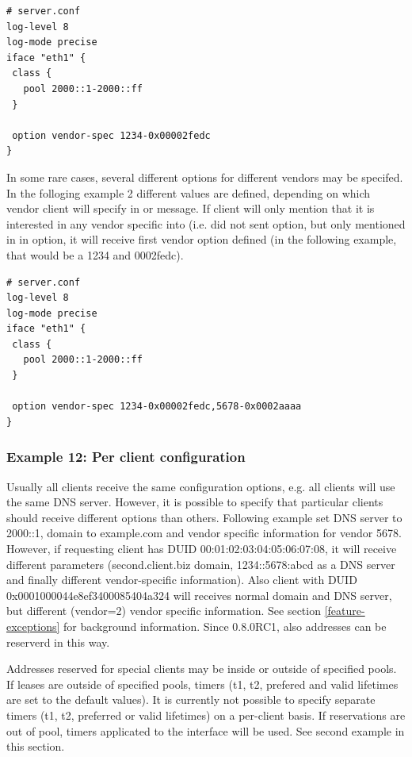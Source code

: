\begin{lstlisting}
# server.conf
log-level 8
log-mode precise
iface "eth1" {
 class {
   pool 2000::1-2000::ff
 }

 option vendor-spec 1234-0x00002fedc
}
\end{lstlisting}

In some rare cases, several different options for different vendors
may be specifed. In the folloging example 2 different values are
defined, depending on which vendor client will specify in  or
 message. If client will only mention that it is interested in
any vendor specific into (i.e. did not sent  option, but
only mentioned in in  option, it will receive
first vendor option defined (in the following example, that would be a
1234 and 0002fedc).

\begin{lstlisting}
# server.conf
log-level 8
log-mode precise
iface "eth1" {
 class {
   pool 2000::1-2000::ff
 }

 option vendor-spec 1234-0x00002fedc,5678-0x0002aaaa
}
\end{lstlisting}

\subsubsection{Example 12: Per client configuration}
\label{example-server-exceptions}
Usually all clients receive the same configuration options, e.g. all
clients will use the same DNS server. However, it is possible to
specify that particular clients should receive different options than
others. Following example set DNS server to 2000::1, domain
to example.com and vendor specific information for vendor 5678.
However, if requesting client has DUID 00:01:02:03:04:05:06:07:08, it
will receive different parameters (second.client.biz domain,
1234::5678:abcd as a DNS server and finally different vendor-specific
information). Also client with DUID 0x0001000044e8ef3400085404a324
will receives normal domain and DNS server, but different (vendor=2)
vendor specific information. See section \ref{feature-exceptions} for
background information. Since 0.8.0RC1, also addresses can be reserverd
in this way.

Addresses reserved for special clients may be inside or outside of
specified pools. If leases are outside of specified pools, timers (t1,
t2, prefered and valid lifetimes are set to the default values). It is
currently not possible to specify separate timers (t1, t2, preferred
or valid lifetimes) on a per-client basis. If reservations are out of
pool, timers applicated to the interface will be used. See second
example in this section.

